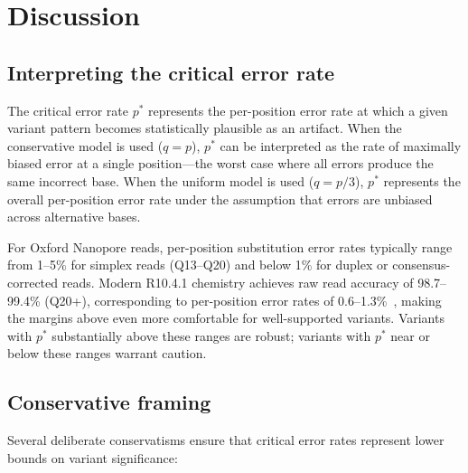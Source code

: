 \documentclass[11pt]{article}
\begin{document}
\section{Discussion}

\subsection{Interpreting the critical error rate}

The critical error rate $p^*$ represents the per-position error rate at which a
given variant pattern becomes statistically plausible as an artifact. When the
conservative model is used ($q = p$), $p^*$ can be interpreted as the rate of
maximally biased error at a single position---the worst case where all errors
produce the same incorrect base. When the uniform model is used ($q = p/3$),
$p^*$ represents the overall per-position error rate under the assumption that
errors are unbiased across alternative bases.

For Oxford Nanopore reads, per-position substitution error rates typically
range from 1--5\% for simplex reads (Q13--Q20) and below 1\% for duplex or
consensus-corrected reads. Modern R10.4.1 chemistry achieves raw read accuracy of
98.7--99.4\% (Q20+), corresponding to per-position error rates of
0.6--1.3\%~\cite{wang2023}, making the margins above even more comfortable for
well-supported variants. Variants with $p^*$ substantially above these ranges
are robust; variants with $p^*$ near or below these ranges warrant caution.

\subsection{Conservative framing}

Several deliberate conservatisms ensure that critical error rates represent lower
bounds on variant significance:
\end{document}
